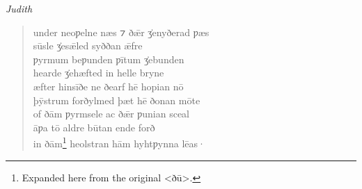 \begin{texts}{\textit{Judith}}
\begin{quote}
    under neoƿelne næs     ⁊ ðǣr \.{ʒ}enyðerad ƿæs\\
    sūsle \.{ʒ}esǣled     syððan ǣfre\\
    ƿyrmum beƿunden     ƿītum \.{ʒ}ebunden\\
    hearde \.{ʒ}ehæfted     in helle bryne\\
    æfter hinsīðe     ne ðearf hē hopian nō\\
    þȳstrum forðylmed     þæt hē ðonan mōte\\
    of ðām ƿyrmsele     ac ðǣr ƿunian sceal\\
    āƿa tō aldre     būtan ende forð\\
    in ðām\footnote{Expanded here from the original <ðū>.} heolstran hām     hyhtƿynna lēas·
\end{quote}


\end{texts}

